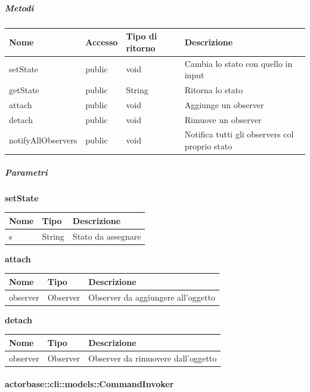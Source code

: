 \documentclass{scalatekids-article}
\begin{document}
\subparagraph{Metodi}

\begin{tabular}{| l | l | l | l |}
  \hline
  Nome & Accesso & Tipo di ritorno & Descrizione\\
  \hline
  setState & public & void & Cambia lo stato con quello in input\\
  \hline
  getState & public & String & Ritorna lo stato\\
  \hline
  attach & public & void & Aggiunge un observer\\
  \hline
  detach & public & void & Rimuove un observer\\
  \hline
  notifyAllObservers & public & void & Notifica tutti gli observers col proprio stato\\
  \hline
\end{tabular}

\subparagraph{Parametri}

\begin{center}
  \textbf{setState}
\end{center}
\begin{tabular}{| p{3cm} | p{3.5cm} | p{8.5cm} |}
  \hline
  Nome & Tipo & Descrizione\\
  \hline
  s & String & Stato da assegnare\\
  \hline
\end{tabular}

\begin{center}
  \textbf{attach}
\end{center}
\begin{tabular}{| p{3cm} | p{3.5cm} | p{8.5cm} |}
  \hline
  Nome & Tipo & Descrizione\\
  \hline
  observer & Observer & Observer da aggiungere all'oggetto\\
  \hline
\end{tabular}

\begin{center}
  \textbf{detach}
\end{center}
\begin{tabular}{| p{3cm} | p{3.5cm} | p{8.5cm} |}
  \hline
  Nome & Tipo & Descrizione\\
  \hline
  observer & Observer & Observer da rimuovere dall'oggetto\\
  \hline
\end{tabular}

\paragraph{actorbase::cli::models::CommandInvoker}
\label{sec:actorbase::cli::models::CommandInvoker}
\end{document}
